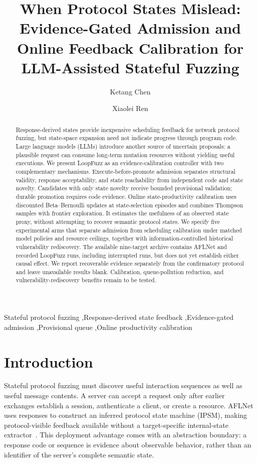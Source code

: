\documentclass[final,5p,times,number]{elsarticle}
\begin{document}
\begin{frontmatter}
\title{When Protocol States Mislead: Evidence-Gated Admission and Online Feedback Calibration for LLM-Assisted Stateful Fuzzing}
\author[inst1]{Ketang Chen}
\author[inst1]{Xiaolei Ren}
\begin{abstract}
Response-derived states provide inexpensive scheduling feedback for network protocol fuzzing, but state-space expansion need not indicate progress through program code. Large language models (LLMs) introduce another source of uncertain proposals: a plausible request can consume long-term mutation resources without yielding useful executions. We present LoopFuzz as an evidence-calibration controller with two complementary mechanisms. Execute-before-promote admission separates structural validity, response acceptability, and state reachability from independent code and state novelty. Candidates with only state novelty receive bounded provisional validation; durable promotion requires code evidence. Online state-productivity calibration uses discounted Beta--Bernoulli updates at state-selection episodes and combines Thompson samples with frontier exploration. It estimates the usefulness of an observed state proxy, without attempting to recover semantic protocol states. We specify five experimental arms that separate admission from scheduling calibration under matched model policies and resource ceilings, together with information-controlled historical vulnerability rediscovery. The available nine-target archive contains AFLNet and recorded LoopFuzz runs, including interrupted runs, but does not yet establish either causal effect. We report recoverable evidence separately from the confirmatory protocol and leave unavailable results blank. Calibration, queue-pollution reduction, and vulnerability-rediscovery benefits remain to be tested.
\end{abstract}
\begin{keyword}
Stateful protocol fuzzing \sep Response-derived state feedback \sep Evidence-gated admission \sep Provisional queue \sep Online productivity calibration
\end{keyword}
\end{frontmatter}

\section{Introduction}
Stateful protocol fuzzing must discover useful interaction sequences as well as useful message contents. A server can accept a request only after earlier exchanges establish a session, authenticate a client, or create a resource. AFLNet uses responses to construct an inferred protocol state machine (IPSM), making protocol-visible feedback available without a target-specific internal-state extractor~\cite{aflnet}. This deployment advantage comes with an abstraction boundary: a response code or sequence is evidence about observable behavior, rather than an identifier of the server's complete semantic state.
\end{document}
